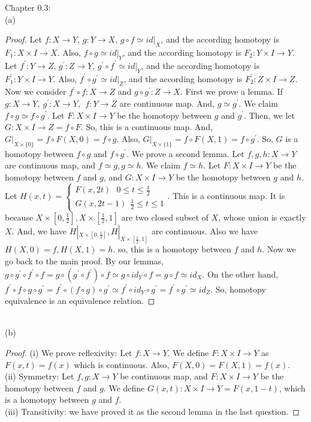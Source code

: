 \documentclass[]{book}
\theoremstyle{definition}
\begin{document}
Chapter 0.3: \\
(a)
\begin{proof}
    Let $f: X\to Y$, $g: Y \to X$, $g \circ f \simeq id|_X$, and the according homotopy is $F_1 : X\times I \to X$. Also, $f \circ g \simeq id|_Y$, and the according homotopy is $F_2 : Y\times I \to Y$. Let $f^{'}: Y\to Z$, $g^{'}: Z \to Y$, $g^{'} \circ f^{'} \simeq id|_Y$, and the according homotopy is $F_1^{'} : Y\times I \to Y$. Also, $f^{'} \circ g^{'} \simeq id|_Z$, and the according homotopy is $F_2^{'} : Z\times I \to Z$. Now we consider $f^{'} \circ f: X \to Z$ and $g\circ g^{'}:Z\to X$. First we prove a lemma. If $g: X \to Y, \ g^{'}: X\to Y,\ \ f: Y\to Z$ are continuous map. And, $g\simeq g^{'}$. We claim $f\circ g\simeq f \circ g^{'}$. Let $F: X\times I \to Y$ be the homotopy between $g$ and $g^{'}$. Then, we let $G: X\times I \to Z= f \circ F$. So, this is a continuous map. And, $G|_{X\times \{0\}}= f \circ F(X,0)=f \circ g$. Also, $G|_{X\times \{1\}}= f \circ F(X,1)=f \circ g^{'}$. So, $G$ is a homotopy between $f\circ g$ and $f\circ g^{'}$. We prove a second lemma. Let $f,g,h: X\to Y$ are continuous map, and $f\simeq g, g\simeq h$. We claim $f\simeq h$. Let $F: X\times I \to Y$ be the homotopy between $f$ and $g$, and $G: X\times I \to Y$ be the homotopy between $g$ and $h$. Let $ H(x,t)= \begin{cases}
         F(x,2t)\ \ \ 0\leq t\leq \frac{1}{2}\\
         G(x,2t-1) \ \ \frac{1}2{\leq t\leq 1}
    \end{cases} $. This is a continuous map. It is because $X\times[0,\frac{1}2{}], X\times [\frac{1}{2}, 1]$ are two closed subset of $X$, whose union is exactly $X$. And, we have $H|_{X\times [0, \frac{1}{2}]}, H|_{X\times [\frac{1}{2}, 1]}$ are continuous. Also we have $H(X,0)=f, H(X,1)=h$. so, this is a homotopy between $f$ and $h$.  Now we go back to the main proof. By our lemmas, $g \circ g^{'} \circ f^{'} \circ f=g \circ (g^{'} \circ f^{'}) \circ f \simeq g\circ id_Y\circ f= g\circ f \simeq id_X$. On the other hand, $f^{'}\circ f \circ g \circ g^{'}=f^{'}\circ (f \circ g) \circ g^{'} \simeq f^{'} \circ id_Y \circ g^{'}=f^{'}\circ g^{'} \simeq id_Z$. So, homotopy equivalence is an equivalence relation.   
\end{proof}
\\
(b)\begin{proof}
    (i) We prove reflexivity: Let $f: X\to Y$. We define $F: X\times I \to Y$ as $F(x,t)=f(x)$ which is continuous. Also, $F(X,0)=F(X,1)=f(x)$.\\
    (ii) Symmetry: Let $f,g : X\to Y$ be continuous map, and $F: X\times I \to Y$ be the homotopy between $f$ and $g$. We define $G(x,t): X\times I \to Y = F(x, 1-t)$, which is a homotopy between $g$ and $f$.\\  (iii) Transitivity: we have proved it as the second lemma in the last question. 
\end{proof}\\
\end{document}
